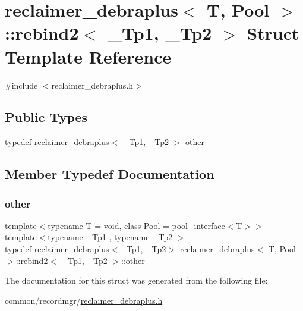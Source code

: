 \hypertarget{structreclaimer__debraplus_1_1rebind2}{}\section{reclaimer\+\_\+debraplus$<$ T, Pool $>$\+:\+:rebind2$<$ \+\_\+\+Tp1, \+\_\+\+Tp2 $>$ Struct Template Reference}
\label{structreclaimer__debraplus_1_1rebind2}


{\ttfamily \#include $<$reclaimer\+\_\+debraplus.\+h$>$}

\subsection*{Public Types}
\begin{DoxyCompactItemize}
\item 
typedef \hyperlink{classreclaimer__debraplus}{reclaimer\+\_\+debraplus}$<$ \+\_\+\+Tp1, \+\_\+\+Tp2 $>$ \hyperlink{structreclaimer__debraplus_1_1rebind2_a326dd5e345faa2bded5bb462bec06698}{other}
\end{DoxyCompactItemize}


\subsection{Member Typedef Documentation}
\mbox{\label{structreclaimer__debraplus_1_1rebind2_a326dd5e345faa2bded5bb462bec06698}} 
\subsubsection{\texorpdfstring{other}{other}}
{\footnotesize\ttfamily template$<$typename T  = void, class Pool  = pool\+\_\+interface$<$\+T$>$$>$ \\
template$<$typename \+\_\+\+Tp1 , typename \+\_\+\+Tp2 $>$ \\
typedef \hyperlink{classreclaimer__debraplus}{reclaimer\+\_\+debraplus}$<$\+\_\+\+Tp1, \+\_\+\+Tp2$>$ \hyperlink{classreclaimer__debraplus}{reclaimer\+\_\+debraplus}$<$ T, Pool $>$\+::\hyperlink{structreclaimer__debraplus_1_1rebind2}{rebind2}$<$ \+\_\+\+Tp1, \+\_\+\+Tp2 $>$\+::\hyperlink{structreclaimer__debraplus_1_1rebind2_a326dd5e345faa2bded5bb462bec06698}{other}}



The documentation for this struct was generated from the following file\+:\begin{DoxyCompactItemize}
\item 
common/recordmgr/\hyperlink{reclaimer__debraplus_8h}{reclaimer\+\_\+debraplus.\+h}\end{DoxyCompactItemize}
